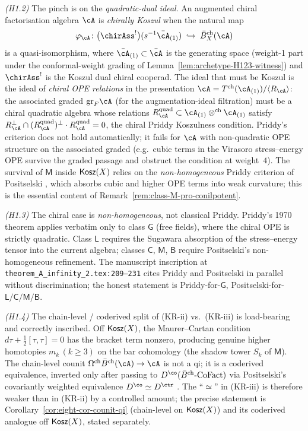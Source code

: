 \emph{(H1.2)} The pinch is on the \emph{quadratic-dual ideal}. An
augmented chiral factorisation algebra $\cA$ is \emph{chirally
Koszul} when the natural map
\[
\varphi_{\cA}\colon \bigl(\chirAss^{!}\bigr)(s^{-1}\bar\cA_{(1)})
\;\hookrightarrow\;
\Bbarch_X(\cA)
\]
is a quasi-isomorphism, where $\bar\cA_{(1)}\subset\bar\cA$ is the
generating space (weight-1 part under the conformal-weight grading of
Lemma~\ref{lem:archetype-H123-witness}) and $\chirAss^{!}$ is the
Koszul dual chiral cooperad. The ideal that must be Koszul is the
ideal of \emph{chiral OPE relations} in the presentation
$\cA = T^{\mathrm{ch}}(\cA_{(1)})/\langle R_{\cA}\rangle$: the
associated graded $\mathrm{gr}_{F}\cA$ (for the augmentation-ideal
filtration) must be a chiral quadratic algebra whose relations
$R_{\cA}^{\mathrm{quad}}\subset \cA_{(1)}\otimes^{\mathrm{ch}}\cA_{(1)}$
satisfy
$R_{\cA}^{\perp}\cap (R_{\cA}^{\mathrm{quad}})^{\perp}\cdot R_{\cA}^{\mathrm{quad}} = 0$,
the chiral Priddy Koszulness condition. Priddy's criterion does not
hold automatically; it fails for $\cA$ with non-quadratic OPE
structure on the associated graded (e.g.\ cubic terms in the Virasoro
stress--energy OPE survive the graded passage and obstruct the
condition at weight~$4$). The survival of $\mathsf{M}$ inside
$\mathsf{Kosz}(X)$ relies on the \emph{non-homogeneous} Priddy criterion of
Positselski \cite[Thm.\ 9.1]{Positselski2018}, which absorbs cubic and
higher OPE terms into weak curvature; this is the essential content
of Remark~\ref{rem:class-M-pro-conilpotent}.

\emph{(H1.3)} The chiral case is \emph{non-homogeneous}, not classical
Priddy. Priddy's 1970 theorem applies verbatim only to class
$\mathsf{G}$ (free fields), where the chiral OPE is strictly
quadratic. Class $\mathsf{L}$ requires the Sugawara absorption of the
stress--energy tensor into the current algebra; classes $\mathsf{C}$,
$\mathsf{M}$, $\mathsf{B}$ require Positselski's non-homogeneous
refinement. The manuscript inscription at
\texttt{theorem\_A\_infinity\_2.tex:209--231} cites Priddy and
Positselski in parallel without discrimination; the honest statement
is Priddy-for-$\mathsf{G}$, Positselski-for-$\mathsf{L/C/M/B}$.

\emph{(H1.4)} The chain-level / coderived split of (KR-ii) vs.\
(KR-iii) is load-bearing and correctly inscribed. Off $\mathsf{Kosz}(X)$, the
Maurer--Cartan condition
$d\tau + \tfrac{1}{2}[\tau,\tau] = 0$
has the bracket term nonzero, producing genuine higher homotopies
$m_{k}\,(k\geq 3)$ on the bar cohomology (the shadow tower $S_{k}$ of
$\mathsf{M}$). The chain-level counit
$\Omegach\Bbarch(\cA)\to\cA$ is not a qi; it is a coderived
equivalence, inverted only after passing to
$D^{\co}(\Bbarch\text{-CoFact})$ via Positselski's covariantly
weighted equivalence $D^{\co}\simeq D^{\ctr}$
\cite[App.\ A.5]{Positselski2011}. The ``$\simeq$'' in (KR-iii) is
therefore weaker than in (KR-ii) by a controlled amount; the precise
statement is Corollary~\ref{cor:eight-cor-counit-qi}
(chain-level on $\mathsf{Kosz}(X)$) and its coderived analogue off
$\mathsf{Kosz}(X)$, stated separately.

